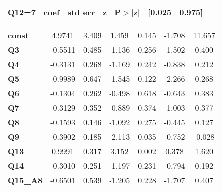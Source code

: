 \begin{center}
\begin{tabular}{lcccccc}
\bottomrule
\end{tabular}
\begin{tabular}{ccccccc}
 \textbf{Q12=7}  & \textbf{coef} & \textbf{std err} & \textbf{z} & \textbf{P$> |$z$|$} & \textbf{[0.025} & \textbf{0.975]}  \\
\midrule
\bottomrule
\end{tabular}
\begin{tabular}{lcccccc}
\textbf{const}   &       4.9741  &        3.409     &     1.459  &         0.145        &       -1.708    &       11.657     \\
\textbf{Q3}      &      -0.5511  &        0.485     &    -1.136  &         0.256        &       -1.502    &        0.400     \\
\textbf{Q4}      &      -0.3131  &        0.268     &    -1.169  &         0.242        &       -0.838    &        0.212     \\
\textbf{Q5}      &      -0.9989  &        0.647     &    -1.545  &         0.122        &       -2.266    &        0.268     \\
\textbf{Q6}      &      -0.1304  &        0.262     &    -0.498  &         0.618        &       -0.643    &        0.383     \\
\textbf{Q7}      &      -0.3129  &        0.352     &    -0.889  &         0.374        &       -1.003    &        0.377     \\
\textbf{Q8}      &      -0.1593  &        0.146     &    -1.092  &         0.275        &       -0.445    &        0.127     \\
\textbf{Q9}      &      -0.3902  &        0.185     &    -2.113  &         0.035        &       -0.752    &       -0.028     \\
\textbf{Q13}     &       0.9991  &        0.317     &     3.152  &         0.002        &        0.378    &        1.620     \\
\textbf{Q14}     &      -0.3010  &        0.251     &    -1.197  &         0.231        &       -0.794    &        0.192     \\
\textbf{Q15\_A8} &      -0.6501  &        0.539     &    -1.205  &         0.228        &       -1.707    &        0.407     \\
\bottomrule
\end{tabular}
\end{center}